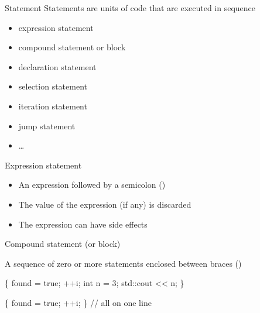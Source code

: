 \begin{frame}{Statement}
  Statements are units of code that are executed in sequence

  \begin{itemize}
  \item expression statement
  \item compound statement or block
  \item declaration statement
  \item selection statement
  \item iteration statement
  \item jump statement
  \item \ldots
  \end{itemize}

\end{frame}


\begin{frame}[fragile]{Expression statement}

  \begin{itemize}[<+->]
  \item An expression followed by a semicolon (\code{;})
  \item The value of the expression (if any) is discarded
  \item The expression can have side effects
  \end{itemize}

  \begin{codeblock}
\end{codeblock}

\end{frame}

\begin{frame}[fragile]{Compound statement (or block)}

  A sequence of zero or more statements enclosed between braces
  (\code{\{\}})

  \begin{codeblock}
\{
   found = true;
   ++i;
   int n = 3;
   std::cout <{}< n;
\}\end{codeblock}

  \begin{codeblock}
\{ found = true; ++i; \ddd \} // all on one line\end{codeblock}

\end{frame}

